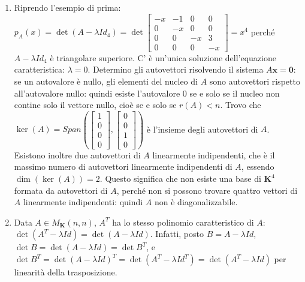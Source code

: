 \documentclass{article}
\begin{document}
\begin{enumerate}
\item Riprendo l'esempio di prima: $p_{A}\left( x\right) =\det \left(
A-\lambda Id_{4}\right) =\det \left[ 
\begin{array}{cccc}
-x & -1 & 0 & 0 \\ 
0 & -x & 0 & 0 \\ 
0 & 0 & -x & 3 \\ 
0 & 0 & 0 & -x%
\end{array}%
\right] =x^{4}$ perch\'{e} $A-\lambda Id_{4}$ \`{e} triangolare superiore. C'%
\`{e} un'unica soluzione dell'equazione caratteristica: $\lambda =0$.
Determino gli autovettori risolvendo il sistema $A\mathbf{x=0}$: se un
autovalore \`{e} nullo, gli elementi del nucleo di $A$ sono autovettori
rispetto all'autovalore nullo: quindi esiste l'autovalore $0$ se e solo se
il nucleo non contine solo il vettore nullo, cio\`{e} se e solo se $r\left(
A\right) <n$. Trovo che $\ker \left( A\right) =Span\left( \left[ 
\begin{array}{c}
1 \\ 
0 \\ 
0 \\ 
0%
\end{array}%
\right] ,\left[ 
\begin{array}{c}
0 \\ 
0 \\ 
1 \\ 
0%
\end{array}%
\right] \right) $ \`{e} l'insieme degli autovettori di $A$. Esistono inoltre
due autovettori di $A$ linearmente indipendenti, che \`{e} il massimo numero
di autovettori linearmente indipendenti di $A$, essendo $\dim \left( \ker
\left( A\right) \right) =2$. Questo significa che non esiste una base di $%
\mathbf{K}^{4}$ formata da autovettori di $A$, perch\'{e} non si possono
trovare quattro vettori di $A$ linearmente indipendenti: quindi $A$ non \`{e}
diagonalizzabile.

\item Data $A\in M_{\mathbf{K}}\left( n,n\right) $, $A^{T}$ ha lo stesso
polinomio caratteristico di $A$: $\det \left( A^{T}-\lambda Id\right) =\det
\left( A-\lambda Id\right) $. Infatti, posto $B=A-\lambda Id$, $\det B=\det
\left( A-\lambda Id\right) =\det B^{T}$, e $\det B^{T}=\det \left( A-\lambda
Id\right) ^{T}=\det \left( A^{T}-\lambda Id^{T}\right) =\det \left(
A^{T}-\lambda Id\right) $ per linearit\`{a} della trasposizione.
\end{enumerate}
\end{document}
